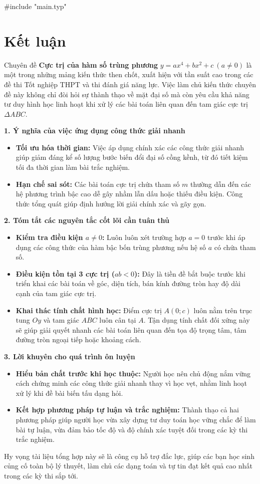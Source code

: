 #include "main.typ"
\section{Kết luận}

Chuyên đề \textbf{Cực trị của hàm số trùng phương} $y = ax^4 + bx^2 + c \ (a \neq 0)$ là một trong những mảng kiến thức then chốt, xuất hiện với tần suất cao trong các đề thi Tốt nghiệp THPT và thi đánh giá năng lực. Việc làm chủ kiến thức chuyên đề này không chỉ đòi hỏi sự thành thạo về mặt đại số mà còn yêu cầu khả năng tư duy hình học linh hoạt khi xử lý các bài toán liên quan đến tam giác cực trị $\Delta ABC$.

\vspace{0.5em}
\noindent \textbf{1. Ý nghĩa của việc ứng dụng công thức giải nhanh}
\begin{itemize}
    \item \textbf{Tối ưu hóa thời gian:} Việc áp dụng chính xác các công thức giải nhanh giúp giảm đáng kể số lượng bước biến đổi đại số cồng kềnh, từ đó tiết kiệm tối đa thời gian làm bài trắc nghiệm.
    \item \textbf{Hạn chế sai sót:} Các bài toán cực trị chứa tham số $m$ thường dẫn đến các hệ phương trình bậc cao dễ gây nhầm lẫn dấu hoặc thiếu điều kiện. Công thức tổng quát giúp định hướng lời giải chính xác và gãy gọn.
\end{itemize}

\vspace{0.5em}
\noindent \textbf{2. Tóm tắt các nguyên tắc cốt lõi cần tuân thủ}
\begin{itemize}
    \item \textbf{Kiểm tra điều kiện $a \neq 0$:} Luôn luôn xét trường hợp $a = 0$ trước khi áp dụng các công thức của hàm bậc bốn trùng phương nếu hệ số $a$ có chứa tham số.
    \item \textbf{Điều kiện tồn tại 3 cực trị ($ab < 0$):} Đây là tiền đề bắt buộc trước khi triển khai các bài toán về góc, diện tích, bán kính đường tròn hay độ dài cạnh của tam giác cực trị.
    \item \textbf{Khai thác tính chất hình học:} Điểm cực trị $A(0; c)$ luôn nằm trên trục tung $Oy$ và tam giác $ABC$ luôn cân tại $A$. Tận dụng tính chất đối xứng này sẽ giúp giải quyết nhanh các bài toán liên quan đến tọa độ trọng tâm, tâm đường tròn ngoại tiếp hoặc khoảng cách.
\end{itemize}

\vspace{0.5em}
\noindent \textbf{3. Lời khuyên cho quá trình ôn luyện}
\begin{itemize}
    \item \textbf{Hiểu bản chất trước khi học thuộc:} Người học nên chủ động nắm vững cách chứng minh các công thức giải nhanh thay vì học vẹt, nhằm linh hoạt xử lý khi đề bài biến tấu dạng hỏi.
    \item \textbf{Kết hợp phương pháp tự luận và trắc nghiệm:} Thành thạo cả hai phương pháp giúp người học vừa xây dựng tư duy toán học vững chắc để làm bài tự luận, vừa đảm bảo tốc độ và độ chính xác tuyệt đối trong các kỳ thi trắc nghiệm.
\end{itemize}

\vspace{1em}
Hy vọng tài liệu tổng hợp này sẽ là công cụ hỗ trợ đắc lực, giúp các bạn học sinh củng cố toàn bộ lý thuyết, làm chủ các dạng toán và tự tin đạt kết quả cao nhất trong các kỳ thi sắp tới.
